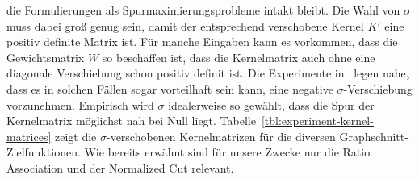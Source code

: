 die Formulierungen als Spurmaximierungsprobleme intakt bleibt. Die Wahl von $\sigma$ muss dabei groß genug sein, damit der
entsprechend verschobene Kernel $K'$ eine positiv definite Matrix ist. Für manche Eingaben kann es vorkommen, dass die
Gewichtsmatrix $W$ so beschaffen ist, dass die Kernelmatrix auch ohne eine diagonale Verschiebung schon positiv definit ist.
Die Experimente in~\cite{DhillonGK04,DhillonGK07} legen nahe, dass es in solchen Fällen sogar vorteilhaft sein kann, eine
negative $\sigma$-Verschiebung vorzunehmen. Empirisch wird $\sigma$ idealerweise so gewählt, dass die Spur der Kernelmatrix
möglichst nah bei Null liegt. Tabelle~\ref{tbl:experiment-kernel-matrices} zeigt die $\sigma$-verschobenen Kernelmatrizen
für die diversen Graphschnitt-Zielfunktionen. Wie bereits erwähnt sind für unsere Zwecke nur die Ratio Association und der
Normalized Cut relevant.
